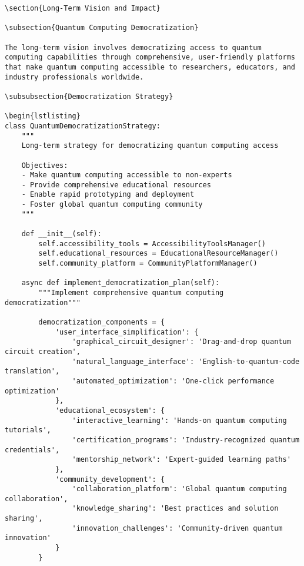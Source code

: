 \documentclass[12pt,a4paper]{report}
\begin{document}
\begin{lstlisting}
\section{Long-Term Vision and Impact}

\subsection{Quantum Computing Democratization}

The long-term vision involves democratizing access to quantum computing capabilities through comprehensive, user-friendly platforms that make quantum computing accessible to researchers, educators, and industry professionals worldwide.

\subsubsection{Democratization Strategy}

\begin{lstlisting}
class QuantumDemocratizationStrategy:
    """
    Long-term strategy for democratizing quantum computing access

    Objectives:
    - Make quantum computing accessible to non-experts
    - Provide comprehensive educational resources
    - Enable rapid prototyping and deployment
    - Foster global quantum computing community
    """

    def __init__(self):
        self.accessibility_tools = AccessibilityToolsManager()
        self.educational_resources = EducationalResourceManager()
        self.community_platform = CommunityPlatformManager()

    async def implement_democratization_plan(self):
        """Implement comprehensive quantum computing democratization"""

        democratization_components = {
            'user_interface_simplification': {
                'graphical_circuit_designer': 'Drag-and-drop quantum circuit creation',
                'natural_language_interface': 'English-to-quantum-code translation',
                'automated_optimization': 'One-click performance optimization'
            },
            'educational_ecosystem': {
                'interactive_learning': 'Hands-on quantum computing tutorials',
                'certification_programs': 'Industry-recognized quantum credentials',
                'mentorship_network': 'Expert-guided learning paths'
            },
            'community_development': {
                'collaboration_platform': 'Global quantum computing collaboration',
                'knowledge_sharing': 'Best practices and solution sharing',
                'innovation_challenges': 'Community-driven quantum innovation'
            }
        }


\end{lstlisting}
\end{document}
